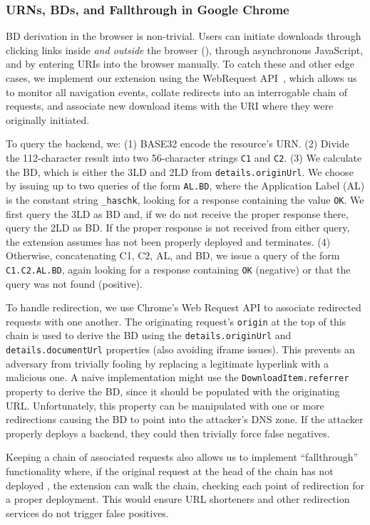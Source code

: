 \subsubsection{URNs, BDs, and Fallthrough in Google Chrome}

BD derivation in the browser is non-trivial. Users can initiate downloads
through clicking links inside \emph{and outside} the browser (), through asynchronous JavaScript, and by entering URIs into the
browser manually. To catch these and other edge cases, we implement our
extension using the WebRequest API~\cite{ExtensionAPI}, which allows us to
monitor all navigation events, collate redirects into an interrogable chain of
requests, and associate new download items with the URI where they were
originally initiated.

To query the backend, we: (1) BASE32 encode the resource's URN. (2) Divide the
112-character result into two 56-character strings \texttt{C1} and \texttt{C2}.
(3) We calculate the BD, which is either the 3LD and 2LD from
\texttt{details.originUrl}. We choose by issuing up to two queries of the form
\texttt{AL.BD}, where the Application Label (AL) is the constant string
\texttt{\_haschk}, looking for a response containing the value \texttt{OK}. We
first query the 3LD as BD and, if we do not receive the proper response there,
query the 2LD as BD. If the proper response is not received from either query,
the extension assumes \SYSTEM{} has not been properly deployed and terminates.
(4) Otherwise, concatenating C1, C2, AL, and BD, we issue a query of the form
\texttt{C1.C2.AL.BD}, again looking for a response containing \texttt{OK}
(negative) or that the query was not found (positive).

To handle redirection, we use Chrome's Web Request API to associate redirected
requests with one another. The originating request's \texttt{origin} at the top
of this chain is used to derive the BD using the \texttt{details.originUrl} and
\texttt{details.documentUrl} properties (also avoiding iframe issues). This
prevents an adversary from trivially fooling \SYSTEM{} by replacing a legitimate
hyperlink with a malicious one. A naive implementation might use the
\texttt{DownloadItem.referrer} property to derive the BD, since it should be
populated with the originating URL. Unfortunately, this property can be
manipulated with one or more redirections causing the BD to point into the
attacker's DNS zone. If the attacker properly deploys a \SYSTEM{} backend, they
could then trivially force false negatives.

Keeping a chain of associated requests also allows us to implement
``fallthrough'' functionality where, if the original request at the head of the
chain has not deployed \SYSTEM{}, the extension can walk the chain, checking
each point of redirection for a proper \SYSTEM{} deployment. This would ensure
URL shorteners and other redirection services do not trigger false positives.

